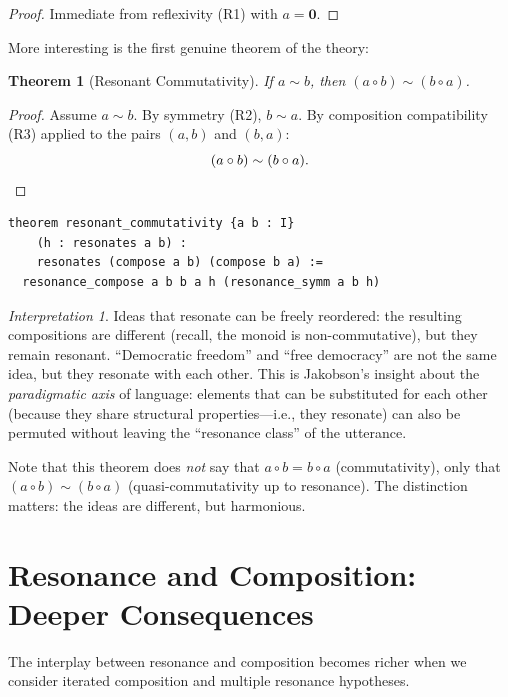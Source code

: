 \documentclass[11pt,openany]{book}
\theoremstyle{definition}
\theoremstyle{plain}
\newtheorem{theorem}[axiom]{Theorem}
\theoremstyle{remark}
\newtheorem{interpretation}[axiom]{Interpretation}
\newcommand{\compose}{\circ}                 %
\newcommand{\void}{\mathbf{0}}              %
\newcommand{\res}{\sim}                      %
\begin{document}
\begin{proof}
Immediate from reflexivity (R1) with $a = \void$.
\end{proof}

More interesting is the first genuine theorem of the theory:

\begin{theorem}[Resonant Commutativity]
\label{thm:resonant-commutativity}
If $a \res b$, then $(a \compose b) \res (b \compose a)$.
\end{theorem}

\begin{proof}
Assume $a \res b$. By symmetry (R2), $b \res a$. By composition compatibility (R3) applied to the pairs $(a, b)$ and $(b, a)$:
\[
(a \compose b) \res (b \compose a). \qedhere
\]
\end{proof}

\begin{lstlisting}
theorem resonant_commutativity {a b : I}
    (h : resonates a b) :
    resonates (compose a b) (compose b a) :=
  resonance_compose a b b a h (resonance_symm a b h)
\end{lstlisting}

\begin{interpretation}
Ideas that resonate can be freely reordered: the resulting compositions are different (recall, the monoid is non-commutative), but they remain resonant. ``Democratic freedom'' and ``free democracy'' are not the same idea, but they resonate with each other. This is Jakobson's insight about the \emph{paradigmatic axis} of language: elements that can be substituted for each other (because they share structural properties---i.e., they resonate) can also be permuted without leaving the ``resonance class'' of the utterance.

Note that this theorem does \emph{not} say that $a \compose b = b \compose a$ (commutativity), only that $(a \compose b) \res (b \compose a)$ (quasi-commutativity up to resonance). The distinction matters: the ideas are different, but harmonious.
\end{interpretation}

\section{Resonance and Composition: Deeper Consequences}

The interplay between resonance and composition becomes richer when we consider iterated composition and multiple resonance hypotheses.
\end{document}
